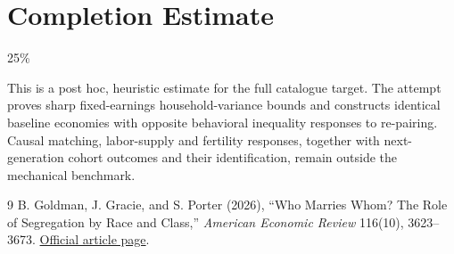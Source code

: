 \documentclass[11pt]{article}
\theoremstyle{definition}
\begin{document}
\section{Completion Estimate}
25\%

This is a post hoc, heuristic estimate for the full catalogue target.
The attempt proves sharp fixed-earnings household-variance bounds and constructs identical baseline economies with opposite behavioral inequality responses to re-pairing. Causal matching, labor-supply and fertility responses, together with next-generation cohort outcomes and their identification, remain outside the mechanical benchmark.

\begin{thebibliography}{9}
 B. Goldman, J. Gracie, and S. Porter (2026), ``Who Marries Whom? The Role of Segregation by Race and Class,'' \emph{American Economic Review} 116(10), 3623--3673. \href{https://www.aeaweb.org/articles?id=10.1257/aer.20250115}{Official article page}.
\end{thebibliography}
\end{document}

